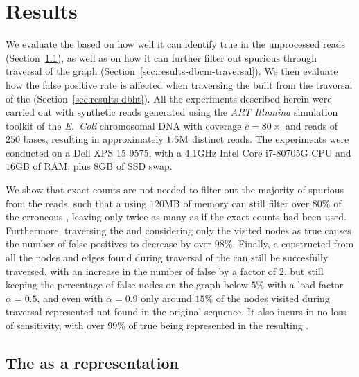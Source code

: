 \chapter{Results}\label{chap:results}

We evaluate the \dBCM based on how well it can identify true  in the unprocessed reads (Section~\ref{sec:results-dbcm-counting}), as well as on how it can further filter out spurious  through traversal of the graph (Section~\ref{sec:results-dbcm-traversal}). We then evaluate how the false positive rate is affected when traversing the \dBHT built from the traversal of the \dBCM (Section~\ref{sec:results-dbht}). All the experiments described herein were carried out with synthetic reads generated using the \emph{ART Illumina} simulation toolkit \cite{Huang2011} of the \emph{E.~Coli} chromosomal DNA \cite{ecoligenome} with coverage $c = 80\times$ and reads of $250$ bases, resulting in approximately $1.5\mega$ distinct reads. The experiments were conducted on a Dell XPS 15 9575, with a $4.1$GHz Intel Core i7-80705G CPU and $16$GB of RAM, plus $8$GB of SSD swap.

We show that exact counts are not needed to filter out the majority of spurious  from the reads, such that a \dBCM using $120$MB of memory can still filter over $80\%$ of the erroneous , leaving only twice as many as if the exact counts had been used. Furthermore, traversing the \dBCM and considering only the visited nodes as true  causes the number of false positives to decrease by over $98\%$. Finally, a \dBHT constructed from all the nodes and edges found during traversal of the \dBCM can still be succesfully traversed, with an increase in the number of false  by a factor of $2$, but still keeping the percentage of false nodes on the graph below $5\%$ with a load factor $\alpha = 0.5$, and even with $\alpha = 0.9$ only around $15\%$ of the nodes visited during traversal represented  not found in the original sequence. It also incurs in no loss of sensitivity, with over $99\%$ of true  being represented in the resulting \dBG. 

\section{The \dBCM as a \dBG representation}
\label{sec:results-dbcm-counting}

